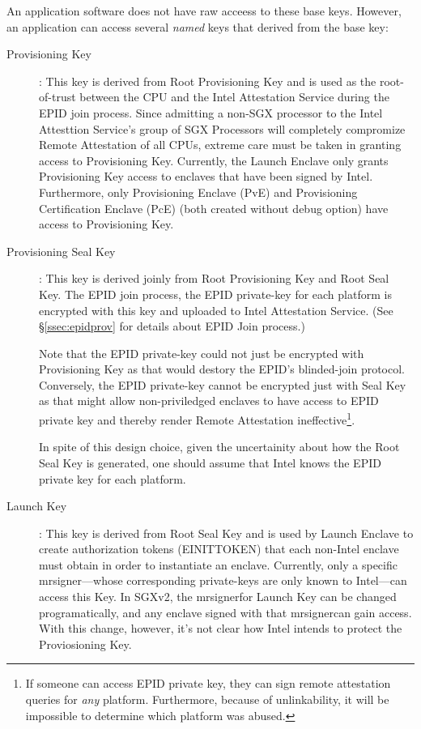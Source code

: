 \documentclass[11pt]{article}
\newcommand{\secref}[1]{\S\ref{#1}}
\newcommand{\mrsigner}{\textsf{mrsigner}}
\newcommand{\pve}{\textsf{PvE}}
\newcommand{\pce}{\textsf{PcE}}
\begin{document}
  An application software does not have raw acceess to these base 
  keys. However, an application can access several \textit{named} 
  keys that derived from the base key:

  \begin{description} 
    \item[Provisioning Key]: This key is derived from Root
      Provisioning Key and is used as the root-of-trust 
      between the CPU and the Intel Attestation Service during the 
      EPID join process. Since admitting a non-SGX processor to 
      the Intel Attesttion Service's group of SGX Processors will 
      completely compromize Remote Attestation of all CPUs, extreme 
      care must be taken in granting access to Provisioning Key. 
      Currently, the Launch Enclave only grants Provisioning Key 
      access to enclaves that have been signed by Intel. Furthermore,
      only Provisioning Enclave (\pve) and Provisioning Certification 
      Enclave (\pce) (both created without debug option) have access to 
      Provisioning Key.

    \item[Provisioning Seal Key]: This key is derived joinly from Root
      Provisioning Key and Root Seal Key. The EPID join process, the 
      EPID private-key for each platform is encrypted with this key
      and uploaded to Intel Attestation Service. (See \secref{ssec:epidprov}
      for details about EPID Join process.)

      Note that the EPID private-key could not just be encrypted with
      Provisioning Key as that would destory the EPID's blinded-join 
      protocol. Conversely, the EPID private-key cannot be encrypted
      just with Seal Key as that might allow non-priviledged enclaves
      to have access to EPID private key and thereby render Remote 
      Attestation ineffective\footnote{If someone can access EPID 
      private key, they can sign remote attestation queries for 
      \textit{any} platform. Furthermore, because of unlinkability, 
      it will be impossible to determine which platform was abused.}. 

      In spite of this design choice, given the uncertainity about 
      how the Root Seal Key is generated, one should assume that 
      Intel knows the EPID private key for each platform.

      \item[Launch Key]: This key is derived from Root Seal Key and 
      is used by Launch Enclave to create authorization tokens 
      (\textsf{EINITTOKEN}) that each non-Intel enclave must obtain 
      in order to instantiate an enclave. Currently, only a specific 
      \mrsigner---whose corresponding private-keys are only known 
      to Intel---can access this Key. In SGXv2, the \mrsigner for 
      Launch Key can be changed programatically, and any enclave 
      signed with that \mrsigner can gain access. With this change, 
      however, it's not clear how Intel intends to protect the 
      Proviosioning Key.


\end{description}
\end{document}
